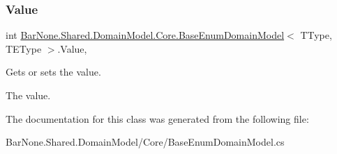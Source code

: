 \subsubsection{\texorpdfstring{Value}{Value}}
{\footnotesize\ttfamily int \mbox{\hyperlink{class_bar_none_1_1_shared_1_1_domain_model_1_1_core_1_1_base_enum_domain_model}{Bar\+None.\+Shared.\+Domain\+Model.\+Core.\+Base\+Enum\+Domain\+Model}}$<$ T\+Type, T\+E\+Type $>$.Value\hspace{0.3cm}{\ttfamily [get]}, {\ttfamily [set]}}



Gets or sets the value. 

The value. 

The documentation for this class was generated from the following file\+:\begin{DoxyCompactItemize}
\item 
Bar\+None.\+Shared.\+Domain\+Model/\+Core/Base\+Enum\+Domain\+Model.\+cs\end{DoxyCompactItemize}
